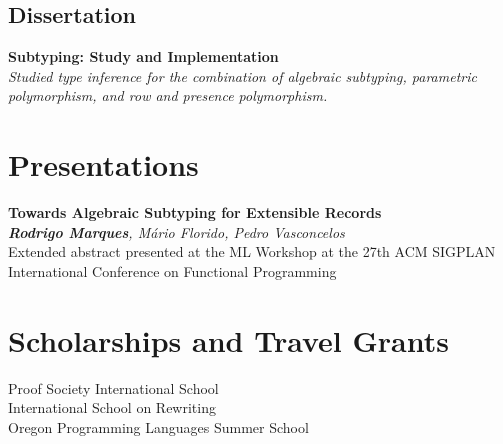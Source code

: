 \documentclass[11pt,a4paper]{moderncv}
\begin{document}
\subsection*{Dissertation}

\begin{description}[labelwidth=60pt,align=right,leftmargin=!]
    \item[\normalfont{\emph{MSc}}] \textbf{Subtyping: Study and Implementation}
                                \\ \emph{Studied type inference for the combination of algebraic subtyping, parametric polymorphism, and row and presence polymorphism.}
\end{description}

\section{Presentations}

\begin{description}[labelwidth=60pt,align=right,leftmargin=!]
    \item[\normalfont{\emph{ML 2022}}]
        \textbf{Towards Algebraic Subtyping for Extensible Records}
        \\ \emph{\textbf{Rodrigo Marques}, Mário Florido, Pedro Vasconcelos}                                
        \\ Extended abstract presented at the ML Workshop at the 27th ACM SIGPLAN International Conference on Functional Programming
\end{description}


\section{Scholarships and Travel Grants}

\begin{description}[labelwidth=60pt,align=right,leftmargin=!]
    \item[\normalfont{\emph{2024}}]
           Proof Society International School
        \\ International School on Rewriting 
        \\ Oregon Programming Languages Summer School
\end{description}
\end{document}
